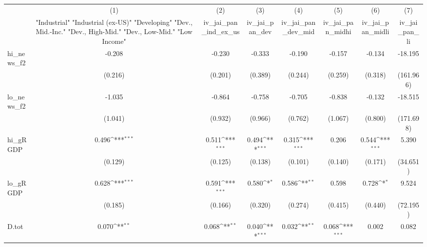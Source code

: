 {
\def\sym#1{\ifmmode^{#1}\else\(^{#1}\)\fi}
\begin{tabular}{l*{7}{c}}
\toprule
            &\multicolumn{1}{c}{(1)}&\multicolumn{1}{c}{(2)}&\multicolumn{1}{c}{(3)}&\multicolumn{1}{c}{(4)}&\multicolumn{1}{c}{(5)}&\multicolumn{1}{c}{(6)}&\multicolumn{1}{c}{(7)}\\
            &\multicolumn{1}{c}{ "Industrial" "Industrial (ex-US)" "Developing" "Dev., Mid.-Inc." "Dev., High-Mid."  "Dev., Low-Mid." "Low Income" }&\multicolumn{1}{c}{iv\_jai\_pan\_ind\_ex\_us}&\multicolumn{1}{c}{iv\_jai\_pan\_dev}&\multicolumn{1}{c}{iv\_jai\_pan\_dev\_mid}&\multicolumn{1}{c}{iv\_jai\_pan\_midhi}&\multicolumn{1}{c}{iv\_jai\_pan\_midli}&\multicolumn{1}{c}{iv\_jai\_pan\_li}\\
\midrule
hi\_news\_f2  &      -0.208         &      -0.230         &      -0.333         &      -0.190         &      -0.157         &      -0.134         &     -18.195         \\
            &     (0.216)         &     (0.201)         &     (0.389)         &     (0.244)         &     (0.259)         &     (0.318)         &   (161.966)         \\
\addlinespace
lo\_news\_f2  &      -1.035         &      -0.864         &      -0.758         &      -0.705         &      -0.838         &      -0.132         &     -18.515         \\
            &     (1.041)         &     (0.932)         &     (0.966)         &     (0.762)         &     (1.067)         &     (0.800)         &   (171.698)         \\
\addlinespace
hi\_gRGDP    &       0.496\sym{***}&       0.511\sym{***}&       0.494\sym{***}&       0.315\sym{***}&       0.206         &       0.544\sym{***}&       5.390         \\
            &     (0.129)         &     (0.125)         &     (0.138)         &     (0.101)         &     (0.140)         &     (0.171)         &    (34.651)         \\
\addlinespace
lo\_gRGDP    &       0.628\sym{***}&       0.591\sym{***}&       0.580\sym{*}  &       0.586\sym{**} &       0.598         &       0.728\sym{*}  &       9.524         \\
            &     (0.185)         &     (0.166)         &     (0.320)         &     (0.274)         &     (0.415)         &     (0.440)         &    (72.195)         \\
\addlinespace
D.tot       &       0.070\sym{**} &       0.068\sym{**} &       0.040\sym{***}&       0.032\sym{**} &       0.068\sym{***}&       0.002         &       0.082         \\

\end{tabular}}
